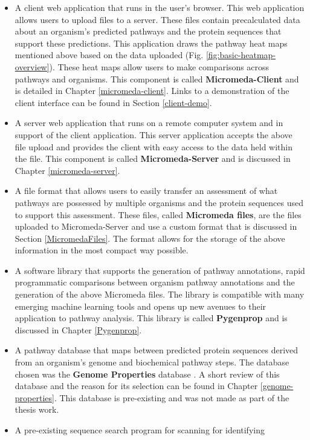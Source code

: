 \begin{itemize}
\item A client web application that runs in the user's browser. This web 
application allows users to upload files to a server. These files contain 
precalculated data about an organism's predicted pathways and the protein 
sequences that support these predictions. This application draws the pathway 
heat maps mentioned above based on the data uploaded (Fig. 
\ref{fig:basic-heatmap-overview}). These heat maps allow users to make 
comparisons across pathways and organisms. This component is called 
\textbf{Micromeda-Client} and is detailed in Chapter \ref{micromeda-client}. 
Links to a demonstration of the client interface can be found in Section 
\ref{client-demo}.
\item A server web application that runs on a remote computer system and in 
support of the client application. This server application accepts the above 
file upload and provides the client with easy access to the data held within the 
file. This component is called \textbf{Micromeda-Server} and is discussed in 
Chapter \ref{micromeda-server}.
\item A file format that allows users to easily transfer an assessment of what 
pathways are possessed by multiple organisms and the protein sequences used to 
support this assessment. These files, called \textbf{Micromeda files}, are the 
files uploaded to Micromeda-Server and use a custom format that is discussed in 
Section \ref{MicromedaFiles}. The format allows for the storage of the above 
information in the most compact way possible.
\item A software library that supports the generation of pathway annotations, 
rapid programmatic comparisons between organism pathway annotations and the 
generation of the above Micromeda files. The library is compatible with many 
emerging machine learning tools and opens up new avenues to their application to 
pathway analysis. This library is called \textbf{Pygenprop} and is discussed in 
Chapter \ref{Pygenprop}.
\item A pathway database that maps between predicted protein sequences derived 
from an organism's genome and biochemical pathway steps. The database chosen was 
the \textbf{Genome Properties} database \cite{richardson2018genome}. A short 
review of this database and the reason for its selection can be found in Chapter 
\ref{genome-properties}. This database is pre-existing and was not made as part 
of the thesis work.
\item A pre-existing sequence search program for scanning for identifying 

\end{itemize}
